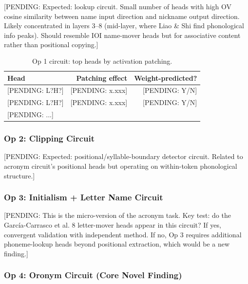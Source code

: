 \documentclass{article}
\newcommand{\PENDING}[1]{{\color{blue}[PENDING: #1]}}
\begin{document}
\PENDING{Expected: lookup circuit. Small number of heads with high OV cosine
similarity between name input direction and nickname output direction. Likely
concentrated in layers 3--8 (mid-layer, where Liao \& Shi find phonological
info peaks). Should resemble IOI name-mover heads but for associative content
rather than positional copying.}

\begin{table}[h!]
\centering
\caption{Op 1 circuit: top heads by activation patching.}
\label{tab:op1_circuit}
\small
\begin{tabular}{lrr}
\toprule
\textbf{Head} & \textbf{Patching effect} & \textbf{Weight-predicted?} \\
\midrule
\PENDING{L?H?} & \PENDING{x.xxx} & \PENDING{Y/N} \\
\PENDING{L?H?} & \PENDING{x.xxx} & \PENDING{Y/N} \\
\PENDING{...}   &                  &                \\
\bottomrule
\end{tabular}
\end{table}

\subsubsection{Op 2: Clipping Circuit}

\PENDING{Expected: positional/syllable-boundary detector circuit. Related to
acronym circuit's positional heads but operating on within-token phonological
structure.}

\subsubsection{Op 3: Initialism + Letter Name Circuit}

\PENDING{This is the micro-version of the acronym task. Key test: do the
Garc\'ia-Carrasco et al. 8 letter-mover heads appear in this circuit?
If yes, convergent validation with independent method.
If no, Op 3 requires additional phoneme-lookup heads beyond positional
extraction, which would be a new finding.}

\subsubsection{Op 4: Oronym Circuit (Core Novel Finding)}
\end{document}
